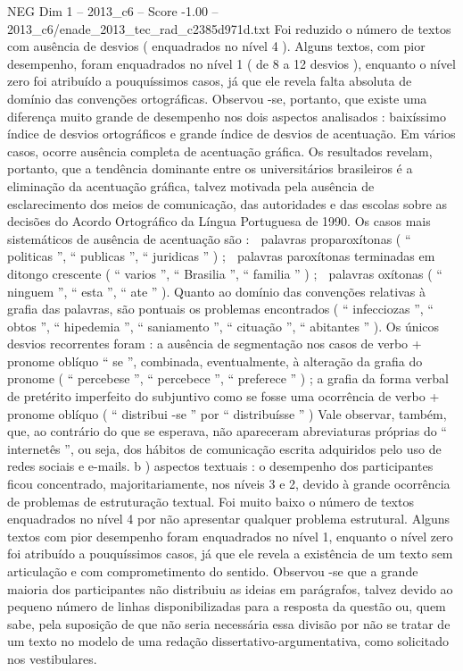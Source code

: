 \begin{textsample}{NEG Dim 1 – 2013\_c6 – Score -1.00 – 2013\_c6/enade\_2013\_tec\_rad\_c2385d971d.txt}
Foi reduzido o número de textos com ausência de desvios ( enquadrados no nível 4 ).
Alguns textos, com pior desempenho, foram enquadrados no nível 1 ( de 8 a 12 desvios ), enquanto o nível zero foi atribuído a pouquíssimos casos, já que ele revela falta absoluta de domínio das convenções ortográficas.
Observou -se, portanto, que existe uma diferença muito grande de desempenho nos dois aspectos analisados : baixíssimo índice de desvios ortográficos e grande índice de desvios de acentuação.
Em vários casos, ocorre ausência completa de acentuação gráfica.
Os resultados revelam, portanto, que a tendência dominante entre os universitários brasileiros é a eliminação da acentuação gráfica, talvez motivada pela ausência de esclarecimento dos meios de comunicação, das autoridades e das escolas sobre as decisões do Acordo Ortográfico da Língua Portuguesa de 1990.
Os casos mais sistemáticos de ausência de acentuação são :  palavras proparoxítonas ( “ politicas ”, “ publicas ”, “ juridicas ” ) ;  palavras paroxítonas terminadas em ditongo crescente ( “ varios ”, “ Brasilia ”, “ familia ” ) ;  palavras oxítonas ( “ ninguem ”, “ esta ”, “ ate ” ).
Quanto ao domínio das convenções relativas à grafia das palavras, são pontuais os problemas encontrados ( “ infecciozas ”, “ obtos ”, “ hipedemia ”, “ saniamento ”, “ cituação ”, “ abitantes ” ).
Os únicos desvios recorrentes foram : a ausência de segmentação nos casos de verbo + pronome oblíquo “ se ”, combinada, eventualmente, à alteração da grafia do pronome ( “ percebese ”, “ percebece ”, “ preferece ” ) ; a grafia da forma verbal de pretérito imperfeito do subjuntivo como se fosse uma ocorrência de verbo + pronome oblíquo ( “ distribui -se ” por “ distribuísse ” ) Vale observar, também, que, ao contrário do que se esperava, não apareceram abreviaturas próprias do “ internetês ”, ou seja, dos hábitos de comunicação escrita adquiridos pelo uso de redes sociais e e-mails. b ) aspectos textuais : o desempenho dos participantes ficou concentrado, majoritariamente, nos níveis 3 e 2, devido à grande ocorrência de problemas de estruturação textual.
Foi muito baixo o número de textos enquadrados no nível 4 por não apresentar qualquer problema estrutural.
Alguns textos com pior desempenho foram enquadrados no nível 1, enquanto o nível zero foi atribuído a pouquíssimos casos, já que ele revela a existência de um texto sem articulação e com comprometimento do sentido.
Observou -se que a grande maioria dos participantes não distribuiu as ideias em parágrafos, talvez devido ao pequeno número de linhas disponibilizadas para a resposta da questão ou, quem sabe, pela suposição de que não seria necessária essa divisão por não se tratar de um texto no modelo de uma redação dissertativo-argumentativa, como solicitado nos vestibulares.

\end{textsample}
